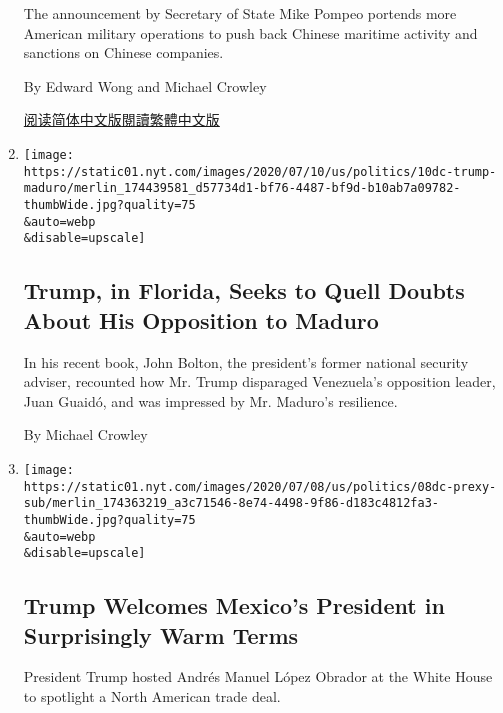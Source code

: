 \begin{enumerate}
  The announcement by Secretary of State Mike Pompeo portends more
  American military operations to push back Chinese maritime activity
  and sanctions on Chinese companies.

  By Edward Wong and Michael Crowley

  \href{https://cn.nytimes.com/asia-pacific/20200714/south-china-sea-pompeo/}{阅读简体中文版}\href{https://cn.nytimes.com/asia-pacific/20200714/south-china-sea-pompeo/zh-hant/}{閱讀繁體中文版}
\item
  \href{/2020/07/10/us/politics/trump-florida-maduro.html}{}

  \texttt{[image: https://static01.nyt.com/images/2020/07/10/us/politics/10dc-trump-maduro/merlin\_174439581\_d57734d1-bf76-4487-bf9d-b10ab7a09782-thumbWide.jpg?quality=75\\\&auto=webp\\\&disable=upscale]}

  \hypertarget{trump-in-florida-seeks-to-quell-doubts-about-his-opposition-to-maduro}{%
  \subsection{Trump, in Florida, Seeks to Quell Doubts About His
  Opposition to
  Maduro}\label{trump-in-florida-seeks-to-quell-doubts-about-his-opposition-to-maduro}}

  In his recent book, John Bolton, the president's former national
  security adviser, recounted how Mr. Trump disparaged Venezuela's
  opposition leader, Juan Guaidó, and was impressed by Mr. Maduro's
  resilience.

  By Michael Crowley
\item
  \href{/2020/07/08/us/politics/trump-mexico-president-andres-manuel-lopez-obrador.html}{}

  \texttt{[image: https://static01.nyt.com/images/2020/07/08/us/politics/08dc-prexy-sub/merlin\_174363219\_a3c71546-8e74-4498-9f86-d183c4812fa3-thumbWide.jpg?quality=75\\\&auto=webp\\\&disable=upscale]}

  \hypertarget{trump-welcomes-mexicos-president-in-surprisingly-warm-terms}{%
  \subsection{Trump Welcomes Mexico's President in Surprisingly Warm
  Terms}\label{trump-welcomes-mexicos-president-in-surprisingly-warm-terms}}

  President Trump hosted Andrés Manuel López Obrador at the White House
  to spotlight a North American trade deal.


\end{enumerate}
